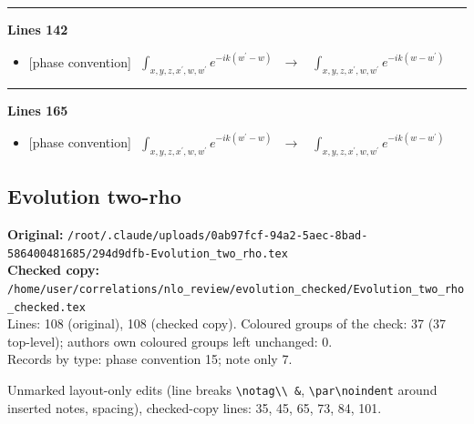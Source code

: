 \documentclass[10pt]{article}
\begin{document}
\noindent\rule{\linewidth}{0.3pt}\par\noindent\textbf{Lines 142} \par
\begin{itemize}[leftmargin=2.2em,itemsep=1pt,topsep=2pt]
\item[\textbf{l.142}] \textsf{\small [phase convention]} $\displaystyle \,\,\int_{x,y,z,x^{\prime},w,w^{\prime}}e^{-ik(w^{\prime}-w)}\,$\ $\longrightarrow$\ $\displaystyle \,\,\int_{x,y,z,x^{\prime},w,w^{\prime}}e^{-ik(w-w^{\prime})}\,$
\end{itemize}
\noindent\rule{\linewidth}{0.3pt}\par\noindent\textbf{Lines 165} \par
\begin{itemize}[leftmargin=2.2em,itemsep=1pt,topsep=2pt]
\item[\textbf{l.165}] \textsf{\small [phase convention]} $\displaystyle \,\,\int_{x,y,z,x^{\prime},w,w^{\prime}}e^{-ik(w^{\prime}-w)}\,$\ $\longrightarrow$\ $\displaystyle \,\,\int_{x,y,z,x^{\prime},w,w^{\prime}}e^{-ik(w-w^{\prime})}\,$
\end{itemize}
\bigskip
\subsection{Evolution two-rho}\label{sec:file-ev_two_rho}
\noindent\textbf{Original:} \texttt{/root/.claude/uploads/0ab97fcf-94a2-5aec-8bad-586400481685/294d9dfb-Evolution\_two\_rho.tex}\\\textbf{Checked copy:} \texttt{/home/user/correlations/nlo\_review/evolution\_checked/Evolution\_two\_rho\_checked.tex}\\
Lines: 108 (original), 108 (checked copy). Coloured groups of the check: 37 (37 top-level); author\textquotesingle s own coloured groups left unchanged: 0.\\
Records by type: phase convention 15; note only 7.
\par\noindent Unmarked layout-only edits (line breaks \texttt{\textbackslash notag\textbackslash\textbackslash\ \&}, \texttt{\textbackslash par\textbackslash noindent} around inserted notes, spacing), checked-copy lines: 35, 45, 65, 73, 84, 101.
\end{document}
